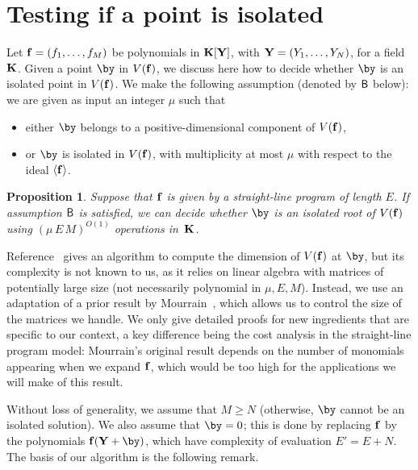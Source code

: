 \documentclass[12pt]{article}
\newtheorem{proposition}[definition]{Proposition}
\begin{document}
\section{Testing if a point is isolated} \label{sec:isolated}

Let $\mathbf{f}=(f_1,\dots,f_M)$ be polynomials in $\mathbf{K}[\mathbf{Y}]$, with
$\mathbf{Y}=(Y_1,\dots,Y_N)$, for a field $\mathbf{K}$. Given a point $\by$ in
$V(\mathbf{f})$, we discuss here how to decide whether $\by$ is an isolated
point in $V(\mathbf{f})$. We make the following assumption (denoted by $\sf B$
below): we are given as input an integer $\mu$ such that
\begin{itemize}
\item either $\by$ belongs to a positive-dimensional component of $V(\mathbf{f})$,
\item or $\by$ is isolated in $V(\mathbf{f})$, with multiplicity at most $\mu$
  with respect to the ideal $\langle \mathbf{f}\rangle$.
\end{itemize}

\begin{proposition}\label{prop:testisolated}
  Suppose that $\mathbf{f}$ is given by a straight-line program of length $E$.
  If assumption $\sf B$ is satisfied, we can decide whether $\by$ is an
  isolated root of $V(\mathbf{f})$ using $(\mu\,E\,M)^{O(1)}$ operations in~$\mathbf{K}$.
\end{proposition}
Reference~\cite{BaHaPeSo09} gives an algorithm to compute the
dimension of $V(\mathbf{f})$ at $\by$, but its complexity is not known to us, as
it relies on linear algebra with matrices of potentially large size
(not necessarily polynomial in $\mu,E,M$).
Instead, we use an adaptation of a prior result by
Mourrain~\cite{Mourrain97}, which allows us to control the size of the
matrices we handle. We only give detailed proofs for new ingredients
that are specific to our context, a key difference being the cost
analysis in the straight-line program model: Mourrain's original
result depends on the number of monomials appearing when we expand
$\mathbf{f}$, which would be too high for the applications we will make of
this result.

Without loss of generality, we assume that $M\ge N$ (otherwise, $\by$
cannot be an isolated solution). We also assume that $\by=0$; this is
done by replacing $\mathbf{f}$ by the polynomials $\f(\Y+\by)$, which have
complexity of evaluation $E'=E+N$.  The basis of our algorithm is the
following remark.
\end{document}
